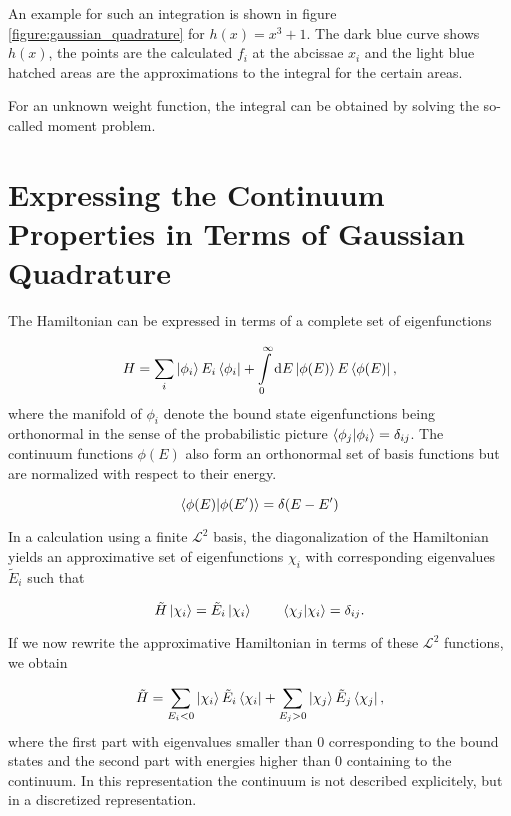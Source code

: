 An example for such an integration is shown in figure \ref{figure:gaussian_quadrature}
for $h(x) = x^3 + 1$. The dark blue curve shows $h(x)$, the points are the
calculated $f_i$ at the abcissae $x_i$ and the light blue hatched areas are the
approximations to the integral for the certain areas.

For an unknown weight function, the integral can be obtained by solving the so-called
moment problem.




\section{Expressing the Continuum Properties in Terms of Gaussian Quadrature}
The Hamiltonian can be expressed in terms of a complete set of eigenfunctions

\begin{equation} \label{equation:complete_hamniltonian}
  H = \sum\limits_i \ket{\phi_i} E_i \bra{\phi_i}
     + \int\limits_0^\infty \mathrm{d}E \ket{\phi(E)} E \bra{\phi(E)}  ,
\end{equation}
where the manifold of $\phi_i$ denote the bound state eigenfunctions being orthonormal
in the sense of the probabilistic picture $\braket{\phi_j|\phi_i} = \delta_{ij}$.
The continuum functions $\phi(E)$ also form an orthonormal set of basis functions
but are normalized with respect to their energy.

\begin{equation}
  \braket{\phi(E) | \phi(E')} = \delta(E-E')
\end{equation}

In a calculation using a finite $\mathcal{L}^2$ basis, the diagonalization of the
Hamiltonian yields an approximative set of eigenfunctions $\chi_i$ with corresponding
eigenvalues $\tilde{E}_i$ such that

\begin{equation}
  \tilde{H} \ket{\chi_i} = \tilde{E}_i \ket{\chi_i} \quad\quad  \,
  \braket{\chi_j|\chi_i} = \delta_{ij} .
\end{equation}

If we now rewrite the approximative Hamiltonian in terms of these $\mathcal{L}^2$
functions, we obtain

\begin{equation}
  \tilde{H} = \sum\limits_{E_i<0} \ket{\chi_i} \tilde{E}_i \bra{\chi_i}
            + \sum\limits_{E_j>0} \ket{\chi_j} \tilde{E}_j \bra{\chi_j}   ,
\end{equation}
where the first part with eigenvalues smaller than 0 corresponding to the
bound states and the second part with energies higher than 0 containing to
the continuum. In this representation the continuum is not described explicitely,
but in a discretized representation.

